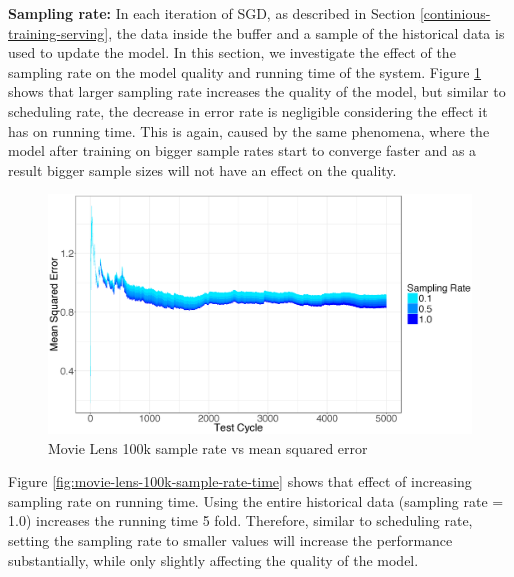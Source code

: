 \documentclass{vldb}
\begin{document}
\textbf{Sampling rate:} In each iteration of SGD, as described in Section \ref{continious-training-serving}, the data inside the buffer and a sample of the historical data is used to update the model.
In this section, we investigate the effect of the sampling rate on the model quality and running time of the system.
Figure \ref{fig:movie-lens-100k-sample-rate} shows that larger sampling rate increases the quality of the model, but similar to scheduling rate, the decrease in error rate is negligible considering the effect it has on running time. 
This is again, caused by the same phenomena, where the model after training on bigger sample rates start to converge faster and as a result bigger sample sizes will not have an effect on the quality.
 
\begin{figure}[!ht]
\centering
\includegraphics[width=\columnwidth]{../images/experiment-results/movie-lens-100k-sampling-rate-improved.eps}
\caption{Movie Lens 100k sample rate vs mean squared error}
\label{fig:movie-lens-100k-sample-rate}
\end{figure}

Figure \ref{fig:movie-lens-100k-sample-rate-time} shows that effect of increasing sampling rate on running time.
Using the entire historical data (sampling rate = 1.0) increases the running time 5 fold. 
Therefore, similar to scheduling rate, setting the sampling rate to smaller values will increase the performance substantially, while only slightly affecting the quality of the model.
\end{document}
